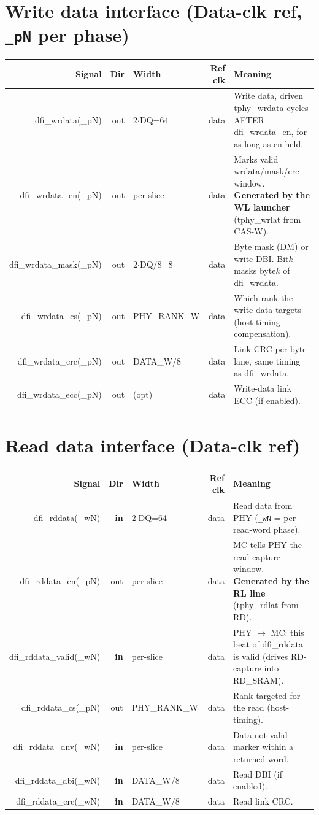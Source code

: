 \documentclass[9pt]{extarticle}
\newenvironment{ports}{%
  \footnotesize\begin{longtable}{N D W R X}\toprule
  \textbf{Signal} & \textbf{Dir} & \textbf{Width} & \textbf{Ref clk} & \textbf{Meaning}\\ \midrule\endhead}
  {\bottomrule\end{longtable}}
\begin{document}
\section{\textcolor{data}{Write data interface} (Data-clk ref, \texttt{\_pN} per phase)}
\begin{ports}
dfi\_wrdata(\_pN)   & out & 2$\cdot$DQ=64 & data & Write data, driven tphy\_wrdata cycles AFTER dfi\_wrdata\_en, for as long as en held.\\
dfi\_wrdata\_en(\_pN)& out & per-slice & data & Marks valid wrdata/mask/crc window. \textbf{Generated by the WL launcher} (tphy\_wrlat from CAS-W).\\
dfi\_wrdata\_mask(\_pN)& out & 2$\cdot$DQ/8=8 & data & Byte mask (DM) or write-DBI. Bit$k$ masks byte$k$ of dfi\_wrdata.\\
dfi\_wrdata\_cs(\_pN)& out & PHY\_RANK\_W & data & Which rank the write data targets (host-timing compensation).\\
dfi\_wrdata\_crc(\_pN)& out & DATA\_W/8 & data & Link CRC per byte-lane, same timing as dfi\_wrdata.\\
dfi\_wrdata\_ecc(\_pN)& out & (opt) & data & Write-data link ECC (if enabled).\\
\end{ports}

\section{\textcolor{data}{Read data interface} (Data-clk ref)}
\begin{ports}
dfi\_rddata(\_wN)    & \textbf{in} & 2$\cdot$DQ=64 & data & Read data from PHY (\texttt{\_wN} = per read-word phase).\\
dfi\_rddata\_en(\_pN)& out & per-slice & data & MC tells PHY the read-capture window. \textbf{Generated by the RL line} (tphy\_rdlat from RD).\\
dfi\_rddata\_valid(\_wN)& \textbf{in} & per-slice & data & PHY $\rightarrow$ MC: this beat of dfi\_rddata is valid (drives RD-capture into RD\_SRAM).\\
dfi\_rddata\_cs(\_pN)& out & PHY\_RANK\_W & data & Rank targeted for the read (host-timing).\\
dfi\_rddata\_dnv(\_wN)& \textbf{in} & per-slice & data & Data-not-valid marker within a returned word.\\
dfi\_rddata\_dbi(\_wN)& \textbf{in} & DATA\_W/8 & data & Read DBI (if enabled).\\
dfi\_rddata\_crc(\_wN)& \textbf{in} & DATA\_W/8 & data & Read link CRC.\\
\end{ports}
\end{document}
